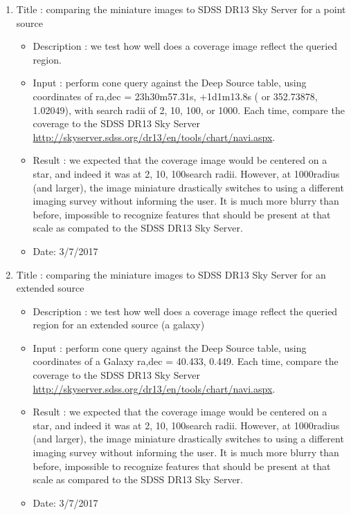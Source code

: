 \documentclass[DM,lsstdraft,toc,usenatbib]{lsstdoc}
\begin{document}
\begin{enumerate}
    \item Title : comparing the miniature images to SDSS DR13 Sky Server for a point source
    \begin{itemize}
      \item Description : we test how  well does a coverage image reflect the queried region.  
      \item Input : perform cone query against the Deep Source table, using coordinates of ra,dec = 23h30m57.31s, +1d1m13.8s  ( or 352.73878\degree ,  1.02049\degree ), with search radii of 2\arcsec, 10\arcsec, 100\arcsec, or 1000\arcsec. Each time, compare the coverage to the SDSS DR13 Sky Server \url{http://skyserver.sdss.org/dr13/en/tools/chart/navi.aspx}. 
      \item Result : we expected that the coverage image would be centered on a star, and indeed it was at 2\arcsec, 10\arcsec, 100\arcsec search radii. However, at 1000\arcsec radius (and larger), the image miniature drastically switches to using a different imaging survey without informing the user. It is much more blurry than before, impossible to recognize features that should be present at that scale as compated to the SDSS DR13 Sky Server. 
      \item Date: 3/7/2017
    \end{itemize}

     \item Title : comparing the miniature images to SDSS DR13 Sky Server for an extended source 
    \begin{itemize}
      \item Description : we test how  well does a coverage image reflect the queried region for an extended source (a galaxy) 
      \item Input : perform cone query against the Deep Source table, using coordinates of a Galaxy  ra,dec =  40.433\degree, 0.449\degree \arcsec. Each time, compare the coverage to the SDSS DR13 Sky Server \url{http://skyserver.sdss.org/dr13/en/tools/chart/navi.aspx}. 
      \item Result : we expected that the coverage image would be centered on a star, and indeed it was at 2\arcsec, 10\arcsec, 100\arcsec search radii. However, at 1000\arcsec radius (and larger), the image miniature drastically switches to using a different imaging survey without informing the user. It is much more blurry than before, impossible to recognize features that should be present at that scale as compared to the SDSS DR13 Sky Server. 
      \item Date: 3/7/2017
    \end{itemize}
\end{enumerate}
\end{document}
